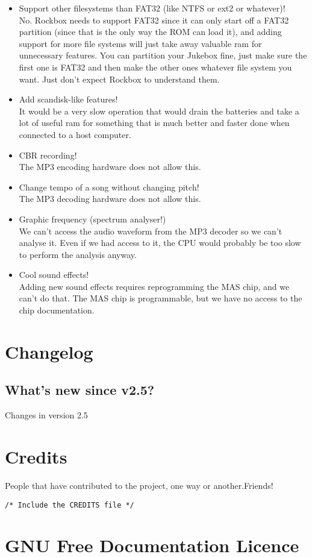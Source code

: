 {\begin{itemize}
  We cannot access information for that kind of visualisation from the MP3 
  decoding hardware.
\item Support other filesystems than FAT32 (like NTFS or ext2 or whatever)!\\
  No. Rockbox needs to support FAT32 since it can only start off a FAT32 
  partition (since that is the only way the ROM can load it), and adding 
  support for more file systems will just take away valuable ram for 
  unnecessary features. You can partition your Jukebox fine, just make sure 
  the first one is FAT32 and then make the other ones whatever file system 
  you want. Just don't expect Rockbox to understand them.
\item Add scandisk{}-like features!\\
  It would be a very slow operation that would drain the batteries and 
  take a lot of useful ram for something that is much better and faster 
  done when connected to a host computer.
\item CBR recording!\\
  The MP3 encoding hardware does not allow this.
\item Change tempo of a song without changing pitch!\\
  The MP3 decoding hardware does not allow this.
\item Graphic frequency (spectrum analyser!)\\
  We can't access the audio waveform from the MP3 decoder so we can't analyse 
  it. Even if we had access to it, the CPU would probably be too slow to 
  perform the analysis anyway.
\item Cool sound effects!\\
  Adding new sound effects requires reprogramming the MAS chip, and we can't 
  do that. The MAS chip is programmable, but we have no access to the chip 
  documentation.
\end{itemize}
}


\chapter{Changelog}
\section{What's new since v2.5?}
Changes in version 2.5

\chapter{Credits}
People that have contributed to the project, one way or another.Friends!
\begin{verbatim}
/* Include the CREDITS file */
\end{verbatim}

\chapter{GNU Free Documentation Licence}

